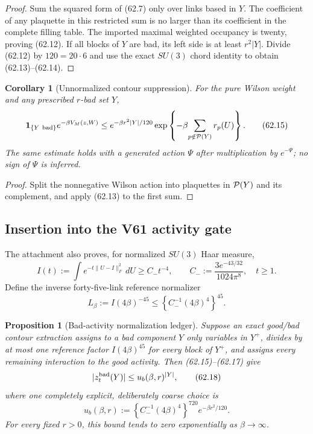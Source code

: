 \documentclass[11pt,oneside]{book}
\newtheorem{proposition}[theorem]{Proposition}
\newtheorem{corollary}[theorem]{Corollary}
\theoremstyle{definition}
\theoremstyle{remark}
\begin{document}
\begin{proof}
Sum the squared form of (62.7) only over links based in \(Y\).
The coefficient of any plaquette in this restricted sum is no
larger than its coefficient in the complete filling table.  The
imported maximal weighted occupancy is twenty, proving (62.12).
If all blocks of \(Y\) are bad, its left side is at least
\(r^2|Y|\).  Divide (62.12) by \(120=20\cdot6\) and use the exact
\(SU(3)\) chord identity to obtain (62.13)--(62.14).
\end{proof}

\begin{corollary}[Unnormalized contour suppression]
\label{cor:e8v62-contour-suppression}
For the pure Wilson weight and any prescribed \(r\)-bad set \(Y\),
\[
 {\bf1}_{\{Y\ {\rm bad}\}}e^{-\beta V_M(z,W)}
 \le
 e^{-\beta r^2|Y|/120}
 \exp\left\{-\beta\!\sum_{p\notin{\cal P}(Y)}r_p(U)\right\}.
                                                                    \tag{62.15}
\]
The same estimate holds with a generated action \(\Psi\) after
multiplication by \(e^{-\Psi}\); no sign of \(\Psi\) is inferred.
\end{corollary}

\begin{proof}
Split the nonnegative Wilson action into plaquettes in
\({\cal P}(Y)\) and its complement, and apply (62.13) to the first
sum.
\end{proof}

\subsection{Insertion into the V61 activity gate}

The attachment also proves, for normalized \(SU(3)\) Haar measure,
\[
 I(t):=\int e^{-t\|U-I\|_F^2}\,dU
 \ge C_-t^{-4},\qquad
 C_-:=\frac{3e^{-43/32}}{1024\pi^8},\quad t\ge1.             \tag{62.16}
\]
Define the inverse forty-five-link reference normalizer
\[
 L_\beta:=I(4\beta)^{-45}
 \le\left\{C_-^{-1}(4\beta)^4\right\}^{45}.                 \tag{62.17}
\]

\begin{proposition}[Bad-activity normalization ledger]
\label{prop:e8v62-bad-ledger}
Suppose an exact good/bad contour extraction assigns to a bad
component \(Y\) only variables in \(Y^+\), divides by at most one
reference factor \(I(4\beta)^{45}\) for every block of \(Y^+\),
and assigns every remaining interaction to the good activity.
Then (62.15)--(62.17) give
\[
 |z_t^{\rm bad}(Y)|
 \le u_b(\beta,r)^{|Y|},                                    \tag{62.18}
\]
where one completely explicit, deliberately coarse choice is
\[
 \boxed{
 u_b(\beta,r):=
 \left\{C_-^{-1}(4\beta)^4\right\}^{720}
 e^{-\beta r^2/120}.}                                       \tag{62.19}
\]
For every fixed \(r>0\), this bound tends to zero exponentially as
\(\beta\to\infty\).
\end{proposition}
\end{document}
